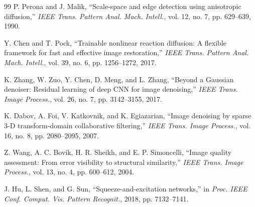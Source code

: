 \documentclass[conference]{IEEEtran}
\begin{document}
\begin{thebibliography}{99}
P. Perona and J. Malik, ``Scale-space and edge detection using anisotropic diffusion,'' \emph{IEEE Trans. Pattern Anal. Mach. Intell.}, vol. 12, no. 7, pp. 629--639, 1990.

Y. Chen and T. Pock, ``Trainable nonlinear reaction diffusion: A flexible framework for fast and effective image restoration,'' \emph{IEEE Trans. Pattern Anal. Mach. Intell.}, vol. 39, no. 6, pp. 1256--1272, 2017.

K. Zhang, W. Zuo, Y. Chen, D. Meng, and L. Zhang, ``Beyond a Gaussian denoiser: Residual learning of deep CNN for image denoising,'' \emph{IEEE Trans. Image Process.}, vol. 26, no. 7, pp. 3142--3155, 2017.

K. Dabov, A. Foi, V. Katkovnik, and K. Egiazarian, ``Image denoising by sparse 3-D transform-domain collaborative filtering,'' \emph{IEEE Trans. Image Process.}, vol. 16, no. 8, pp. 2080--2095, 2007.

Z. Wang, A. C. Bovik, H. R. Sheikh, and E. P. Simoncelli, ``Image quality assessment: From error visibility to structural similarity,'' \emph{IEEE Trans. Image Process.}, vol. 13, no. 4, pp. 600--612, 2004.

J. Hu, L. Shen, and G. Sun, ``Squeeze-and-excitation networks,'' in \emph{Proc. IEEE Conf. Comput. Vis. Pattern Recognit.}, 2018, pp. 7132--7141.
\end{thebibliography}
\end{document}

